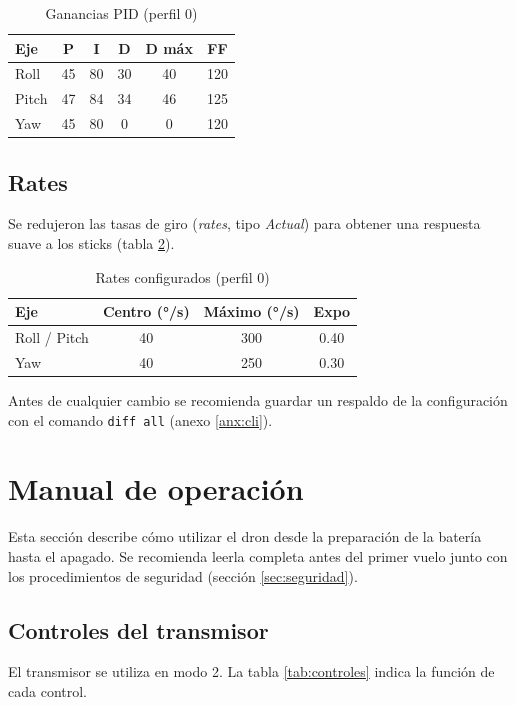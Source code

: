 \documentclass[11pt,letterpaper]{article}
\begin{document}
\begin{table}[!ht]
\centering
\caption{Ganancias PID (perfil 0)}
\label{tab:pid}
\begin{tabular}{@{}lccccc@{}}
\toprule
\textbf{Eje} & \textbf{P} & \textbf{I} & \textbf{D} & \textbf{D máx} & \textbf{FF} \\
\midrule
Roll  & 45 & 80 & 30 & 40 & 120 \\
Pitch & 47 & 84 & 34 & 46 & 125 \\
Yaw   & 45 & 80 & 0  & 0  & 120 \\
\bottomrule
\end{tabular}
\end{table}

\subsection{Rates}
Se redujeron las tasas de giro (\textit{rates}, tipo \textit{Actual}) para obtener una respuesta suave a los sticks (tabla \ref{tab:rates}).

\begin{table}[!ht]
\centering
\caption{Rates configurados (perfil 0)}
\label{tab:rates}
\begin{tabular}{@{}lccc@{}}
\toprule
\textbf{Eje} & \textbf{Centro (°/s)} & \textbf{Máximo (°/s)} & \textbf{Expo} \\
\midrule
Roll / Pitch & 40 & 300 & 0.40 \\
Yaw          & 40 & 250 & 0.30 \\
\bottomrule
\end{tabular}
\end{table}

Antes de cualquier cambio se recomienda guardar un respaldo de la configuración con el comando \texttt{diff all} (anexo \ref{anx:cli}).

\section{Manual de operación}
\label{sec:manual}
Esta sección describe cómo utilizar el dron desde la preparación de la batería hasta el apagado. Se recomienda leerla completa antes del primer vuelo junto con los procedimientos de seguridad (sección \ref{sec:seguridad}).

\subsection{Controles del transmisor}
El transmisor se utiliza en modo 2. La tabla \ref{tab:controles} indica la función de cada control.
\end{document}
